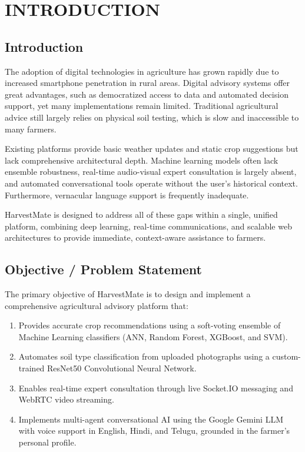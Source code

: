 \documentclass[12pt,a4paper]{report}
\begin{document}
\clearpage

\setcounter{page}{1}

\chapter{INTRODUCTION}

\section{Introduction}

The adoption of digital technologies in agriculture has grown rapidly due to increased smartphone penetration in rural areas. Digital advisory systems offer great advantages, such as democratized access to data and automated decision support, yet many implementations remain limited. Traditional agricultural advice still largely relies on physical soil testing, which is slow and inaccessible to many farmers.

Existing platforms provide basic weather updates and static crop suggestions but lack comprehensive architectural depth. Machine learning models often lack ensemble robustness, real-time audio-visual expert consultation is largely absent, and automated conversational tools operate without the user's historical context. Furthermore, vernacular language support is frequently inadequate. 

HarvestMate is designed to address all of these gaps within a single, unified platform, combining deep learning, real-time communications, and scalable web architectures to provide immediate, context-aware assistance to farmers.

\section{Objective / Problem Statement}

The primary objective of HarvestMate is to design and implement a comprehensive agricultural advisory platform that:
\begin{enumerate}
    \item Provides accurate crop recommendations using a soft-voting ensemble of Machine Learning classifiers (ANN, Random Forest, XGBoost, and SVM).
    \item Automates soil type classification from uploaded photographs using a custom-trained ResNet50 Convolutional Neural Network.
    \item Enables real-time expert consultation through live Socket.IO messaging and WebRTC video streaming.
    \item Implements multi-agent conversational AI using the Google Gemini LLM with voice support in English, Hindi, and Telugu, grounded in the farmer's personal profile.
\end{enumerate}
\end{document}
